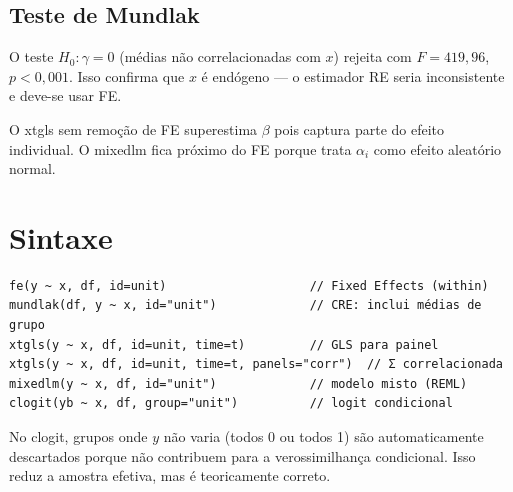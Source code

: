 \subsection*{Teste de Mundlak}

O teste $H_0: \gamma = 0$ (médias não correlacionadas com $x$) rejeita com
$F = 419{,}96$, $p < 0{,}001$. Isso confirma que $x$ é endógeno — o estimador
RE seria inconsistente e deve-se usar FE.

O xtgls sem remoção de FE superestima $\beta$ pois captura parte do efeito
individual. O mixedlm fica próximo do FE porque trata $\alpha_i$ como efeito
aleatório normal.

\section{Sintaxe}

\begin{lstlisting}
fe(y ~ x, df, id=unit)                    // Fixed Effects (within)
mundlak(df, y ~ x, id="unit")             // CRE: inclui médias de grupo
xtgls(y ~ x, df, id=unit, time=t)         // GLS para painel
xtgls(y ~ x, df, id=unit, time=t, panels="corr")  // Σ correlacionada
mixedlm(y ~ x, df, id="unit")             // modelo misto (REML)
clogit(yb ~ x, df, group="unit")          // logit condicional
\end{lstlisting}

\begin{nota}
  No clogit, grupos onde $y$ não varia (todos 0 ou todos 1) são
  automaticamente descartados porque não contribuem para a verossimilhança
  condicional. Isso reduz a amostra efetiva, mas é teoricamente correto.
\end{nota}
